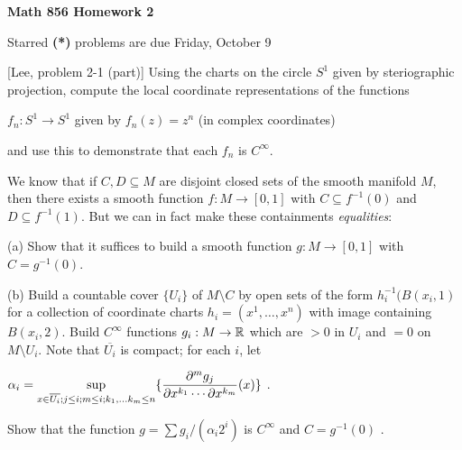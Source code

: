 
\nopagenumbers


\loadmsbm

\def\ctln{\centerline}
\def\ssk{\smallskip}
\def\msk{\medskip}
\def\bsk{\bigskip}
\def\nidt{\noindent}
\def\del{\partial}
\def\bbr{{\Bbb R}}
\def\ra{\rightarrow}
\def\lra{$\Leftrightarrow$}


\ctln{\bf Math 856 Homework 2}

\ssk

\ctln{Starred {\bf (*)} problems are due Friday, October 9}

\bsk

\nidt {\bf (*) 9:} [Lee, problem 2-1 (part)] Using the charts on the circle $S^1$ given 
by steriographic projection, compute the local coordinate representations of the functions

\ssk

\ctln{$f_n:S^1\rightarrow S^1$ given by $f_n(z)=z^n$ (in complex coordinates)}

\ssk

and use this to demonstrate that each $f_n$ is $C^\infty$.

\bsk

\nidt {\bf 10:} We know that if $C,D\subseteq M$ are disjoint closed sets of the smooth manifold $M$,
then there exists a smooth function $f:M\ra [0,1]$ with $C\subseteq f^{-1}(0)$ and $D\subseteq f^{-1}(1)$.
But we can in fact make these containments {\it equalities}:

\ssk

(a) Show that it suffices to build a smooth function $g:M\ra [0,1]$ with $C=g^{-1}(0)$.

\ssk

(b) Build a countable cover $\{U_i\}$ of $M\setminus C$ by open sets of the form $h_i^{-1}(B(x_i,1)$ for
a collection of coordinate charts $h_i=(x^1,\ldots,x^n)$ with image containing $B(x_i,2)$. Build $C^\infty$ functions $g_i:M\ra \bbr$ which are $>0$
in $U_i$ and $=0$ on $M\setminus U_i$. Note that $\overline{U_i}$ is compact; for each $i$, let

\ssk

\ctln{$\displaystyle \alpha_i = \sup_{x\in \overline{U_i};j\leq i;m\leq i;k_1,\ldots 
k_m\leq n}\{ {{\del^m g_j}\over{\del x^{k_1}\cdots \del x^{k_m}}}(x)\}$ .}

\ssk

\noindent Show that the function $g=\sum g_i/(\alpha_i 2^i)$ is $C^\infty$ and $C=g^{-1}(0)$ .

